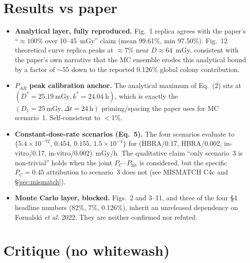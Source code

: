 \documentclass[11pt]{article}
\begin{document}
\section{Results vs paper}
\begin{itemize}
    \item \textbf{Analytical layer, fully reproduced.} Fig.~1 replica agrees with the paper's
    ``$\approx 100\%$ over 10--45~mGy'' claim (mean 99.61\%, min 97.50\%). Fig.~12
    theoretical curve replica peaks at $\approx 7\%$ near $D\approx 64$~mGy, consistent
    with the paper's own narrative that the MC ensemble erodes this analytical bound by
    a factor of $\sim 55$ down to the reported 0.126\% global colony contribution.
    \item \textbf{$P_{AR}$ peak calibration anchor.} The analytical maximum of Eq.~(2) sits
    at $(D^{*}=25.19~\text{mGy}, k^{*}=24.04~\text{h})$, which is exactly the
    $(D_1=25~\text{mGy}, \Delta t=24~\text{h})$ priming/spacing the paper uses for MC
    scenario~1. Self-consistent to $<1\%$.
    \item \textbf{Constant-dose-rate scenarios (Eq.~5).} The four scenarios evaluate to
    $\{5.4\times 10^{-72},\, 0.454,\, 0.155,\, 1.5\times 10^{-4}\}$ for
    (HBRA/0.17, HBRA/0.002, in-vitro/0.17, in-vitro/0.002)~mGy/h.
    The qualitative claim ``only scenario~3 is non-trivial'' holds when the joint
    $P_C\cdot P_{\text{hit}}$ is considered, but the specific $P_C=0.45$ attribution to
    scenario~3 does not (see MISMATCH C4c and \S\ref{sec:mismatch}).
    \item \textbf{Monte Carlo layer, blocked.} Figs.~2 and 3--11, and three of the four
    \S4 headline numbers (82\%, 7\%, 0.126\%), inherit an unreleased dependency on
    Fornalski \emph{et al.} 2022. They are neither confirmed nor refuted.
\end{itemize}

\section{Critique (no whitewash)}
\label{sec:critique}
\end{document}
